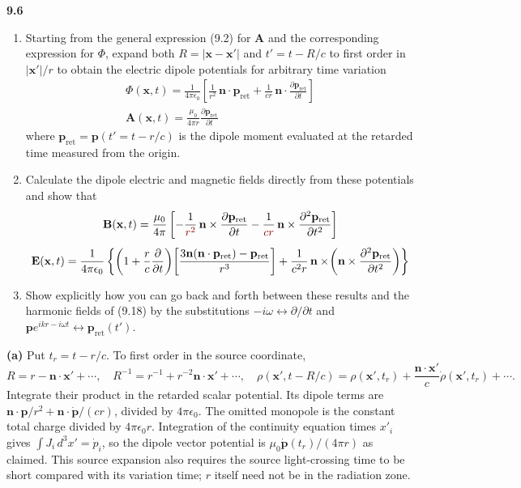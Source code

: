 \par\bigskip
\noindent\textbf{9.6}\quad\begin{enumerate}
\item[(a)] Starting from the general expression (9.2) for $\mathbf{A}$ and the corresponding expression for $\Phi$, expand both $R=|\mathbf{x}-\mathbf{x}'|$ and $t'=t-R/c$ to first order in $|\mathbf{x}'|/r$ to obtain the electric dipole potentials for arbitrary time variation
\begin{gather*}
\Phi(\mathbf{x},t)=\frac{1}{4\pi\epsilon_{0}}\left[\frac{1}{r^{2}}\,\mathbf{n}\cdot\mathbf{p}_{\mathrm{ret}}+\frac{1}{cr}\,\mathbf{n}\cdot\frac{\partial\mathbf{p}_{\mathrm{ret}}}{\partial t}\right]\\[4pt]
\mathbf{A}(\mathbf{x},t)=\frac{\mu_{0}}{4\pi r}\frac{\partial\mathbf{p}_{\mathrm{ret}}}{\partial t}
\end{gather*}
where $\mathbf{p}_{\mathrm{ret}}=\mathbf{p}(t'=t-r/c)$ is the dipole moment evaluated at the retarded time measured from the origin.
\item[(b)] Calculate the dipole electric and magnetic fields directly from these potentials and show that
\begin{gather*}
\mathbf{B}(\mathbf{x},t)=\frac{\mu_{0}}{4\pi}\left[-\frac{1}{\erratum{r^{2}}}\,\mathbf{n}\times\frac{\partial\mathbf{p}_{\mathrm{ret}}}{\partial t}-\frac{1}{\erratum{cr}}\,\mathbf{n}\times\frac{\partial^{2}\mathbf{p}_{\mathrm{ret}}}{\partial t^{2}}\right]\\[4pt]
\mathbf{E}(\mathbf{x},t)=\frac{1}{4\pi\epsilon_{0}}\left\{\left(1+\frac{r}{c}\frac{\partial}{\partial t}\right)\!\left[\frac{3\mathbf{n}(\mathbf{n}\cdot\mathbf{p}_{\mathrm{ret}})-\mathbf{p}_{\mathrm{ret}}}{r^{3}}\right]+\frac{1}{c^{2}r}\,\mathbf{n}\times\!\left(\mathbf{n}\times\frac{\partial^{2}\mathbf{p}_{\mathrm{ret}}}{\partial t^{2}}\right)\right\}
\end{gather*}
\item[(c)] Show explicitly how you can go back and forth between these results and the harmonic fields of (9.18) by the substitutions $-i\omega\leftrightarrow\partial/\partial t$ and $\mathbf{p}e^{ikr-i\omega t}\leftrightarrow\mathbf{p}_{\mathrm{ret}}(t')$.
\end{enumerate}
\solution

\textbf{(a)} Put $t_r=t-r/c$. To first order in the source coordinate,
\[
R=r-\mathbf n\cdot\mathbf x'+\cdots,\quad
R^{-1}=r^{-1}+r^{-2}\mathbf n\cdot\mathbf x'+\cdots,\quad
\rho(\mathbf x',t-R/c)=\rho(\mathbf x',t_r)
+\frac{\mathbf n\cdot\mathbf x'}c\dot\rho(\mathbf x',t_r)+\cdots.
\]
Integrate their product in the retarded scalar potential. Its dipole
terms are $\mathbf n\cdot\mathbf p/r^2+
\mathbf n\cdot\dot{\mathbf p}/(cr)$, divided by $4\pi\epsilon_0$.
The omitted monopole is the constant total charge divided by
$4\pi\epsilon_0r$. Integration of the continuity equation times $x'_i$
gives $\int J_i\,d^3x'=\dot p_i$, so the dipole vector potential is
$\mu_0\dot{\mathbf p}(t_r)/(4\pi r)$ as claimed. This source expansion
also requires the source light-crossing time to be short compared with
its variation time; $r$ itself need not be in the radiation zone.

